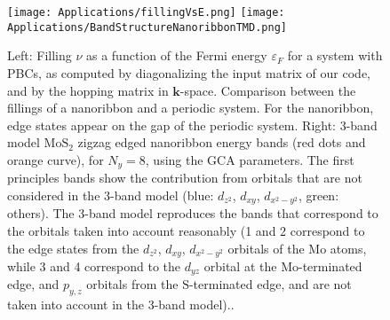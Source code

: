 \begin{figure}[H]
\texttt{[image: Applications/fillingVsE.png]}
\texttt{[image: Applications/BandStructureNanoribbonTMD.png]}
	\caption[Filling $\nu$ as a function of the Fermi energy $\varepsilon_F$ for a \acs{TMD} monolayer and a nanoribbon. $\text{Mo}\text{S}_2$.  \acs{TMDNR} band structure obtained by the 3-band model.]{Left: Filling $\nu$ as a function of the Fermi energy $\varepsilon_F$ for a system with \acp{PBC}, as computed by diagonalizing the input matrix of our code, and by the hopping matrix in $\bm k$-space. Comparison between the fillings of a nanoribbon and a periodic system.
	For the nanoribbon, edge states appear on the gap of the periodic system.
	Right: 3-band model $\text{Mo}\text{S}_2$ zigzag edged nanoribbon energy bands (red dots and orange curve), for $N_y = 8$, using the GCA parameters. The first principles bands show the contribution from orbitals that are not considered in the 3-band model (blue:  $d_{z^2}$, $d_{xy}$, $d_{x^2-y^2}$, green: others). The 3-band model reproduces the bands that correspond to the orbitals taken into account reasonably (1 and 2 correspond to the edge states from the $d_{z^2}$, $d_{xy}$, $d_{x^2-y^2}$ orbitals of the $\text{Mo}$ atoms, while 3 and 4 correspond to the $d_{yz}$ orbital at the $\text{Mo}$-terminated edge, and $p_{y, z}$ orbitals from the $\text{S}$-terminated edge, and are not taken into account in the 3-band model).\cite{liu_three-band_2013}.}
	\label{fig:fillingVsE}
\end{figure}

